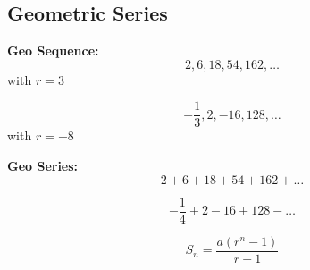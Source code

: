 \documentclass[12pt,a4paper]{article}
\newenvironment{GS}[1]
{\subsection*{#1}\begin{minipage}{0.9\linewidth}\raggedright}
{\end{minipage}}
\begin{document}
\begin{GS}{Geometric Series}
    \begin{minipage}[t]{0.45\linewidth}
        \textbf{Geo Sequence:} 
        \[2, 6, 18, 54, 162, \ldots\] with \(r=3\)

        \[-\frac{1}{3}, 2, -16, 128, \ldots\] with \(r=-8\)
    \end{minipage}%
    \begin{minipage}[t]{0.45\linewidth}
        \textbf{Geo Series:}
        \[2+6+18+54+162+\ldots\]

        \[-\frac{1}{4}+2-16+128-\ldots\]
    \end{minipage}
    \[S_n = \frac{a(r^n-1)}{r-1}\]
\end{GS}
\end{document}
